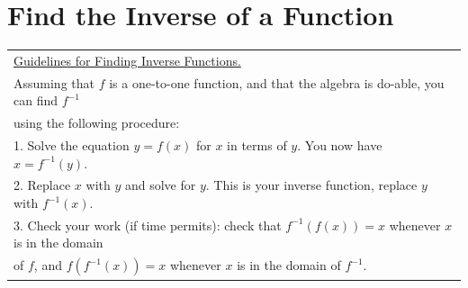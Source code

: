 \documentclass[11pt]{article}
\begin{document}
\begin{enumerate}
\begin{enumerate}

\end{enumerate}


\newpage



\section{Find the Inverse of a Function}

\noindent \begin{tabular}{ | l  |} \hline
\noindent \underline{Guidelines for Finding Inverse Functions.} \\
Assuming that $f$ is a one-to-one function, and that the algebra is do-able, you can find $f^{-1}$ \\ using the following procedure: \\
1. Solve the equation $y=f(x)$ for $x$ in terms of $y$. You now have $x = f^{-1}(y)$. \\
2. Replace $x$ with $y$ and solve for $y$. This is your inverse function, replace $y$ with $f^{-1}(x)$. \\ 
3. Check your work (if time permits): check that $f^{-1}(f(x))=x$ whenever $x$ is in the domain\\ of $f$, and $f(f^{-1}(x))=x$ whenever $x$ is in the domain of $f^{-1}$. \\ \hline
\end{tabular} 



\end{enumerate}
\end{document}
